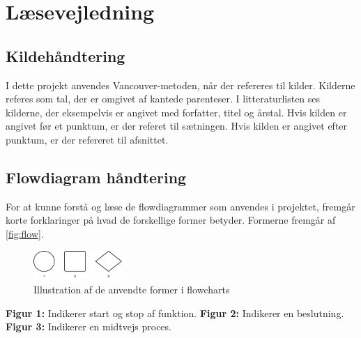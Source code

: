 \section{Læsevejledning}



\subsection{Kildehåndtering}
I dette projekt anvendes Vancouver-metoden, når der refereres til kilder. Kilderne referes som tal, der er omgivet af kantede parenteser. I litteraturlisten ses kilderne, der eksempelvis er angivet med forfatter, titel og årstal. Hvis kilden er angivet før et punktum, er der referet til sætningen. Hvis kilden er angivet efter punktum, er der refereret til afsnittet. 


\subsection{Flowdiagram håndtering} \label{sec:flowhaandtering}
For at kunne forstå og læse de flowdiagrammer som anvendes i projektet, fremgår korte forklaringer på hvad de forskellige former betyder. Formerne fremgår af \autoref{fig:flow}.

\begin{figure}[H]
\centering
\includegraphics[width=0.3\textwidth]{figures/flow}
\caption{Illustration af de anvendte former i flowcharts}
\label{fig:flow}
\end{figure}

\textbf{Figur 1:} Indikerer start og stop af funktion.
\textbf{Figur 2:} Indikerer en beslutning.
\textbf{Figur 3:} Indikerer en midtvejs proces.